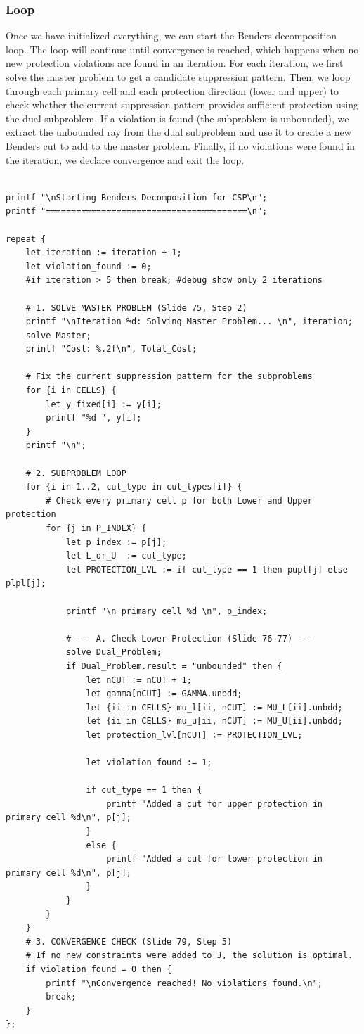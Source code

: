 \documentclass[11pt,a4paper]{article}
\begin{document}
\subsubsection{Loop}
Once we have initialized everything, we can start the Benders decomposition loop.
The loop will continue until convergence is reached, which happens when no new protection violations are found in an iteration.
For each iteration, we first solve the master problem to get a candidate suppression pattern.
Then, we loop through each primary cell and each protection direction (lower and upper) to check whether the current suppression pattern provides sufficient protection using the dual subproblem.
If a violation is found (the subproblem is unbounded), we extract the unbounded ray from the dual subproblem and use it to create a new Benders cut to add to the master problem.
Finally, if no violations were found in the iteration, we declare convergence and exit the loop.
\begin{lstlisting}

printf "\nStarting Benders Decomposition for CSP\n";
printf "========================================\n";

repeat {
    let iteration := iteration + 1;
    let violation_found := 0;
	#if iteration > 5 then break; #debug show only 2 iterations
	
    # 1. SOLVE MASTER PROBLEM (Slide 75, Step 2)
    printf "\nIteration %d: Solving Master Problem... \n", iteration;
    solve Master;
    printf "Cost: %.2f\n", Total_Cost;
	
    # Fix the current suppression pattern for the subproblems
    for {i in CELLS} {
        let y_fixed[i] := y[i];
        printf "%d ", y[i];
    }
    printf "\n";

    # 2. SUBPROBLEM LOOP
	for {i in 1..2, cut_type in cut_types[i]} {
    	# Check every primary cell p for both Lower and Upper protection
	    for {j in P_INDEX} {
	        let p_index := p[j];
	        let L_or_U  := cut_type;
	        let PROTECTION_LVL := if cut_type == 1 then pupl[j] else plpl[j];
	        
	        printf "\n primary cell %d \n", p_index;
	
	        # --- A. Check Lower Protection (Slide 76-77) ---
	        solve Dual_Problem;
	        if Dual_Problem.result = "unbounded" then {          
	            let nCUT := nCUT + 1;
	            let gamma[nCUT] := GAMMA.unbdd;
                let {ii in CELLS} mu_l[ii, nCUT] := MU_L[ii].unbdd;
                let {ii in CELLS} mu_u[ii, nCUT] := MU_U[ii].unbdd;
	            let protection_lvl[nCUT] := PROTECTION_LVL;
	            
	            let violation_found := 1;
	            
	            if cut_type == 1 then {
					printf "Added a cut for upper protection in primary cell %d\n", p[j];
				}
				else {
					printf "Added a cut for lower protection in primary cell %d\n", p[j];
				}
			}
	    }
    }
    # 3. CONVERGENCE CHECK (Slide 79, Step 5)
    # If no new constraints were added to J, the solution is optimal.
    if violation_found = 0 then {
        printf "\nConvergence reached! No violations found.\n";
        break;
    }
};
\end{lstlisting}
\end{document}
